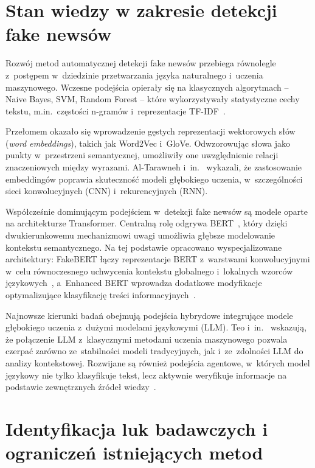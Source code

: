 \documentclass[oneside,polski,logo]{amuthesis}
\begin{document}
\section{Stan wiedzy w zakresie detekcji fake newsów}

Rozwój metod automatycznej detekcji fake newsów przebiega równolegle z~postępem w~dziedzinie przetwarzania języka naturalnego i~uczenia maszynowego. Wczesne podejścia opierały się na klasycznych algorytmach -- Naive Bayes, SVM, Random Forest -- które wykorzystywały statystyczne cechy tekstu, m.in.\ częstości n-gramów i~reprezentacje TF-IDF~\cite{Jouhar2024}.

Przełomem okazało się wprowadzenie gęstych reprezentacji wektorowych słów (\textit{word embeddings}), takich jak Word2Vec i~GloVe. Odwzorowując słowa jako punkty w~przestrzeni semantycznej, umożliwiły one uwzględnienie relacji znaczeniowych między wyrazami. Al-Tarawneh i~in.~\cite{AlTarawneh2024} wykazali, że zastosowanie embeddingów poprawia skuteczność modeli głębokiego uczenia, w~szczególności sieci konwolucyjnych (CNN) i~rekurencyjnych (RNN).

Współcześnie dominującym podejściem w~detekcji fake newsów są modele oparte na architekturze Transformer. Centralną rolę odgrywa BERT~\cite{Devlin2019BERTPO}, który dzięki dwukierunkowemu mechanizmowi uwagi umożliwia głębsze modelowanie kontekstu semantycznego. Na tej podstawie opracowano wyspecjalizowane architektury: FakeBERT łączy reprezentacje BERT z~warstwami konwolucyjnymi w~celu równoczesnego uchwycenia kontekstu globalnego i~lokalnych wzorców językowych~\cite{Kaliyar2021}, a~Enhanced BERT wprowadza dodatkowe modyfikacje optymalizujące klasyfikację treści informacyjnych~\cite{Aljawarneh2024}.

Najnowsze kierunki badań obejmują podejścia hybrydowe integrujące modele głębokiego uczenia z~dużymi modelami językowymi (LLM). Teo i~in.~\cite{Teo2024} wskazują, że połączenie LLM z~klasycznymi metodami uczenia maszynowego pozwala czerpać zarówno ze~stabilności modeli tradycyjnych, jak i~ze~zdolności LLM do analizy kontekstowej. Rozwijane są również podejścia agentowe, w~których model językowy nie tylko klasyfikuje tekst, lecz aktywnie weryfikuje informacje na podstawie zewnętrznych źródeł wiedzy~\cite{Li2024}.

\section{Identyfikacja luk badawczych i ograniczeń istniejących metod}
\end{document}
